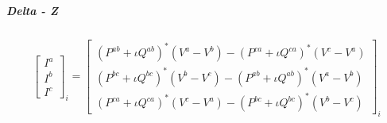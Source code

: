 \documentclass[10pt,journal]{article}
\begin{document}
\subparagraph{Delta - Z }
 
\begin{align}
\begin{bmatrix}
    I^a\\
    I^b\\
    I^c
    \end{bmatrix}_i = \begin{bmatrix}
   ({ P^{ab} +\iota Q^{ab}})^*{(V^a-V^b)} - ({ P^{ca} +\iota Q^{ca}})^*{(V^c-V^a)} \\
     ({ P^{bc} +\iota Q^{bc}})^*{(V^b-V^c)} -  ({ P^{ab} +\iota Q^{ab}})^*{(V^a-V^b)}\\
    ({ P^{ca} +\iota Q^{ca}})^*{(V^c-V^a)} - ({ P^{bc} +\iota Q^{bc}})^*{(V^b-V^c)}
    \end{bmatrix}_i 
    \end{align}
\end{document}
